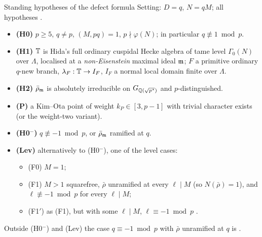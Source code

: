 \begin{frame}{Standing hypotheses of the defect formula}
  \small
  Setting: $D=q$, $N=qM$; all hypotheses .
  \begin{itemize}\setlength{\itemsep}{2pt}
    \item \textbf{(H0)} $p\ge5$, $q\ne p$, $(M,pq)=1$, $p\nmid\varphi(N)$; in particular $q\not\equiv1\bmod p$.
    \item \textbf{(H1)} $\mathbb T$ is Hida's full ordinary cuspidal Hecke algebra of tame level $\Gamma_0(N)$ over $\Lambda$,
      localised at a \emph{non-Eisenstein} maximal ideal $\mathfrak m$; $F$ a primitive ordinary $q$-new branch, $\lambda_F:\mathbb T\to I_F$,
      $I_F$ a normal local domain finite over $\Lambda$.
    \item \textbf{(H2)} $\bar\rho_\mathfrak m$ is absolutely irreducible on $G_{\mathbb{Q}(\sqrt{p^*})}$ and $p$-distinguished.
    \item \textbf{(P)} a Kim--Ota point of weight $k_P\in[3,p-1]$ with trivial character exists (or the weight-two variant).
    \item \textbf{(H0$^-$)} $q\not\equiv-1\bmod p$, or $\bar\rho_\mathfrak m$ ramified at $q$.
    \item \textbf{(Lev)} alternatively to (H0$^-$), one of the level cases:
      \begin{itemize}\setlength{\itemsep}{0pt}
        \item (F0) $M=1$;
        \item (F1) $M>1$ squarefree, $\bar\rho$ unramified at every $\ell\mid M$ (so $N(\bar\rho)=1$), and $\ell\not\equiv-1\bmod p$ for every $\ell\mid M$;
        \item (F1$'$) as (F1), but with some $\ell\mid M$, $\ell\equiv-1\bmod p$ .
      \end{itemize}
  \end{itemize}
  {\footnotesize Outside (H0$^-$) and (Lev) the case $q\equiv-1\bmod p$ with $\bar\rho$ unramified at $q$ is .}
\end{frame}

